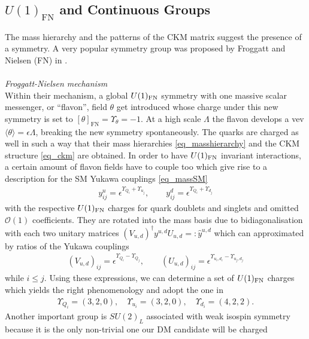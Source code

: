 \subsection{$U(1)_\text{FN}$ and Continuous Groups}
\label{sec_FNGT}
The mass hierarchy and the patterns of the CKM matrix suggest the presence of a symmetry. A very popular symmetry group was proposed
by Froggatt and Nielsen (FN) in \cite{FN}. 
\\ \\ \textit{Froggatt-Nielsen mechanism}\\
\noindent Within their mechanism, a global $U(1)_\text{FN}$ symmetry with one massive scalar messenger, 
or ``flavon'', field $\theta$ get introduced whose charge under this new symmetry is set to $[\theta]_\text{FN} = \Upsilon_\theta=-1$. At a high scale $\Lambda$ the
flavon develops a vev $\langle \theta \rangle = \epsilon\Lambda$, breaking the new symmetry spontaneously. The quarks are charged as well in such 
a way that their mass hierarchies \eqref{eq_masshierarchy} and the CKM structure \eqref{eq_ckm} are obtained. In order to have $U(1)_\text{FN}$ invariant
interactions, a certain amount of flavon fields have to couple too which give rise to a description for the SM Yukawa couplings \eqref{eq_massSM}
\begin{align}
 y^u_{ij} = \epsilon^{\Upsilon_{Q_i} + \Upsilon_{u_j}},\qquad y^d_{ij} = \epsilon^{\Upsilon_{Q_i} + \Upsilon_{d_j}}
 \label{eq_quarkyukawa}
\end{align}
with the respective $U(1)_\text{FN}$ charges for quark doublets and singlets and omitted $\mathcal{O}(1)$ coefficients. They are rotated into the mass basis 
due to bidiagonalisation with each two unitary
matrices ${\left(V_{u,d}\right)^\dagger y^{u,d}U_{u,d}=:\hat{y}^{u,d}}$ which can approximated by ratios of the Yukawa couplings \cite{1501.07268}
\begin{align}
 \left(V_{u,d}\right)_{ij} = \epsilon^{\Upsilon_{Q_i} - \Upsilon_{Q_j}},\qquad\left(U_{u,d}\right)_{ij} = \epsilon^{\Upsilon_{u_i,d_i} - \Upsilon_{u_j,d_j}}
\end{align}
while $i\leq j$. Using these expressions, we can determine a set of $U(1)_\text{FN}$ charges which yields the right phenomenology and adopt the one in
\cite{1501.07268}
\begin{align}
 \Upsilon_{Q_i}=(3,2,0),\quad \Upsilon_{u_i}=(3,2,0),\quad \Upsilon_{d_i}=(4,2,2).
 \label{eq_fnchargesQ}
\end{align}
Another important group is $SU(2)_L$ associated with weak isospin symmetry because it is the only non-trivial one our DM candidate will be charged 

